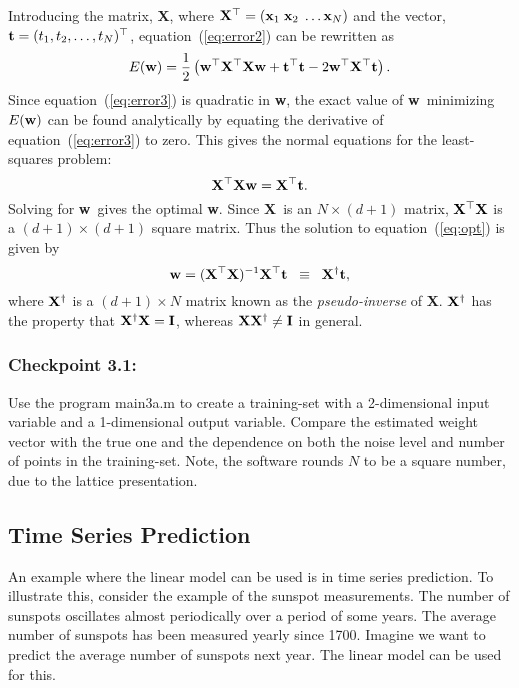 \documentclass[times,12pt]{article}    %
\def\x{{\bf x}}
\def\X{{\bf X}}
\def\w{{\bf w}}
\def\t{{\bf t}}
\def\I{{\bf I}}
\begin{document}
Introducing the matrix, \X, where $\X^\top=(\x_1\; \x_2\; \ldots
\x_N)$ and the vector, $\t = (t_1, t_2,\ldots, t_N)^\top$,
equation~(\ref{eq:error2}) can be rewritten as
\begin{equation}
  \label{eq:error3}
  E(\w) = \frac{1}{2} \left( \w^\top \X^\top \X \w + \t^\top \t -
  2\w^\top \X^\top \t  \right).
\end{equation}
Since equation~(\ref{eq:error3}) is quadratic in \w, the exact value
of \w\ minimizing $E(\w)$ can be found analytically by equating the
derivative of equation~(\ref{eq:error3}) to zero. This gives the
normal equations for the least-squares problem:
\begin{equation}
  \label{eq:opt}
  \X^\top \X \w = \X^\top \t.
\end{equation}
Solving for \w\ gives the optimal \w.
Since \X\ is an $N\times (d+1)$ matrix, $\X^\top \X$ is a $(d+1)\times
(d+1)$ square matrix. Thus the solution to equation~(\ref{eq:opt}) is
given by
\begin{equation}
  \label{eq:sol}
  \w = (\X^\top \X)^{-1} \X^\top \t \;\; \equiv \;\; \X^\dag \t,
\end{equation}
where $\X^\dag$ is a $(d+1)\times N$ matrix known as the {\sl
  pseudo-inverse} of \X. $\X^\dag$ has the property that $\X^\dag \X =
  \I$, whereas $\X\X^\dag \neq \I$ in general.

\subsubsection*{Checkpoint 3.1:}
Use the program {\sf main3a.m} to create a training-set with a
2-dimensional input variable and a 1-dimensional output variable.
Compare the estimated weight vector with the true one and the
dependence on both the noise level and number of points in the
training-set. Note, the software rounds $N$ to be a square number,
due to the lattice presentation.
%

\subsection*{Time Series Prediction}
An example where the linear model can be used is in time series
prediction. To illustrate this, consider the example of the sunspot
measurements. The number of sunspots oscillates almost periodically
over a period of some years. The average number of sunspots has been
measured yearly since 1700. Imagine we want to predict the average
number of sunspots next year. The linear model can be used for this.
\end{document}
